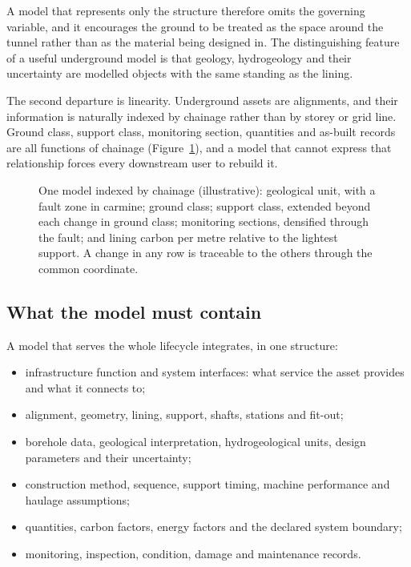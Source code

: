 A model that represents only the structure therefore omits the governing
variable, and it encourages the ground to be treated as the space
around the tunnel rather than as the material being designed in. The
distinguishing feature of a useful underground model is that geology,
hydrogeology and their uncertainty are modelled objects with the same standing
as the lining.

The second departure is linearity. Underground assets are alignments, and
their information is naturally indexed by chainage rather than by storey or
grid line. Ground class, support class, monitoring section, quantities and
as-built records are all functions of chainage (Figure~\ref{fig:dt-chainage}), and a model that cannot
express that relationship forces every downstream user to rebuild it.

\begin{figure}[htbp]
\centering
{}
\caption{One model indexed by chainage (illustrative): geological unit, with a
fault zone in carmine; ground class; support class, extended beyond each change
in ground class; monitoring sections, densified through the fault; and lining
carbon per metre relative to the lightest support. A change in any row is
traceable to the others through the common coordinate.}
\label{fig:dt-chainage}
\end{figure}

\subsection{What the model must contain}
\label{sec:model-contents}

A model that serves the whole lifecycle integrates, in one structure:

\begin{itemize}
 \item infrastructure function and system interfaces: what service the
 asset provides and what it connects to;
 \item alignment, geometry, lining, support, shafts, stations and fit-out;
 \item borehole data, geological interpretation, hydrogeological units,
 design parameters and their uncertainty;
 \item construction method, sequence, support timing, machine performance and
 haulage assumptions;
 \item quantities, carbon factors, energy factors and the declared system
 boundary;
 \item monitoring, inspection, condition, damage and maintenance records.
\end{itemize}

